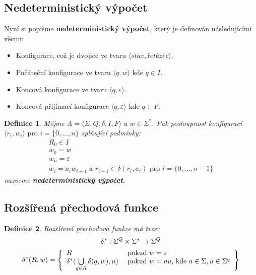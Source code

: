 \documentclass[10pt, a4paper, titlepage]{article}
\theoremstyle{note}
\newtheorem{definice}{\textbf{Definice}}
\begin{document}
\subsection{Nedeterministický výpočet}
Nyní si popišme \textbf{nedeterministický výpočet}, který je definován následujícími věcmi:
\begin{itemize}
\item
Konfigurace, což je dvojice ve tvaru $\langle \textit{stav}, \textit{řetězec} \rangle $.
\item
Počáteční konfigurace ve tvaru $\langle q, w \rangle \text{ kde } q \in I$.
\item
Koncová konfigurace ve tvaru $\langle q, \varepsilon \rangle $.
\item
Koncová přijímací konfigurace $\langle q, \varepsilon \rangle \text{ kde } q \in F$.
\end{itemize}

\begin{definice}
Mějme $A = \langle \Sigma, Q, \delta, I, F \rangle  \text{ a } w \in \Sigma^{*}$. Pak posloupnost konfigurací $\langle r_{i}, w_{i} \rangle \text{ pro } i = \lbrace 0, \ldots, n \rbrace $ splňující podmínky:
\begin{gather}
R_{0} \in I \\
w_{0} = w \\
w_{n} = \varepsilon \\
w_{i} = a_{i}w_{i+1} \text{ a } r_{i+1} \in \delta (r_{i}, a_{i}) \text{ pro } i = \lbrace 0, \ldots,  n-1 \rbrace
\end{gather}
nazveme \textbf{nedeterministický výpočet}.
\end{definice}

\subsection{Rozšířená přechodová funkce}
\begin{definice}
Rozšířená přechodová funkce má tvar:
\begin{gather*}
\delta^{*} : \Sigma^{Q} \times \Sigma^{*} \rightarrow \Sigma^{Q} \\
\delta^{*}(R, w) = \left\lbrace
\begin{array}{l l}
R & \text{ pokud } w = \varepsilon \\
\delta^{*}(\bigcup\limits_{q \in R} \delta(q, w), u) & \text{ pokud } w = au\text{, kde } a \in \Sigma, u \in \Sigma^{q} \\
\end{array}
\right\rbrace
\end{gather*}
\end{definice}
\end{document}
